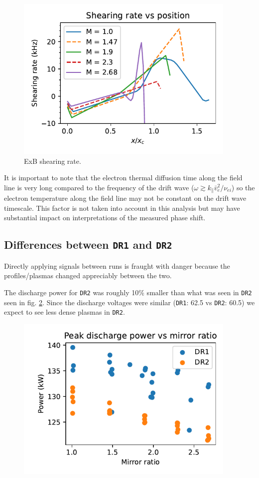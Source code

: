 \begin{figure}
    \centering
    \includegraphics[width=300pt]{figures/extra/ExB_shearing-rate_zoomed.pdf}
    \caption[ExB shearing rate]{ExB shearing rate.}
    \label{fig_extra:ExB_shearing-rate}
\end{figure}


It is important to note that the electron thermal diffusion time along the field line is very long compared to the frequency of the drift wave ($\omega \gtrsim k_\parallel \bar{v}_e^2 / \nu_{ei}$) \cite{Goldston_textbook} so the electron temperature along the field line may not be constant on the drift wave timescale. This factor is not taken into account in this analysis but may have substantial impact on interpretations of the measured phase shift.

\subsection{Differences between \texttt{DR1} and \texttt{DR2}}
Directly applying signals between runs is fraught with danger because the profiles/plasmas changed appreciably between the two.

The discharge power for \texttt{DR2} was roughly 10\% smaller than what was seen in \texttt{DR2} seen in fig. \ref{fig_extra:discharger-power_vs_M}. Since the discharge voltages were similar (\texttt{DR1}: 62.5 vs \texttt{DR2}: 60.5) we expect to see less dense plasmas in \texttt{DR2}. 
\begin{figure}
    \centering
    \includegraphics[width=300pt]{figures/extra/discharge-power_vs_M.pdf}
    \caption[Discharge power vs mirror ratio]{}
    \label{fig_extra:discharger-power_vs_M}
\end{figure}

